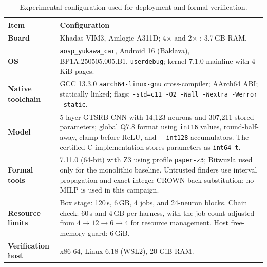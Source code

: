 \begin{table}[h]
\centering
\caption{Experimental configuration used for deployment and formal verification.}
\label{tab:setup}
\scriptsize
\renewcommand{\arraystretch}{1.12}
\setlength{\tabcolsep}{4pt}
\begin{tabularx}{\columnwidth}{@{}>{\bfseries}p{}X@{}}
\toprule
\textbf{Item} & \textbf{Configuration} \\
\midrule

Board &
Khadas VIM3, Amlogic A311D; 4$\times$ \Aseven{} and
2$\times$ \Athree{}; 3.7\,GB RAM. \\

\addlinespace[1pt]
OS &
\AAOS{} \texttt{aosp\_yukawa\_car}, Android 16 (Baklava),
BP1A.250505.005.B1, \texttt{userdebug}; kernel
7.1.0-mainline with 4\,KiB pages. \\

\addlinespace[1pt]
Native toolchain &
GCC 13.3.0 \texttt{aarch64-linux-gnu} cross-compiler;
AArch64 ABI; statically linked; flags:
\texttt{-std=c11 -O2 -Wall -Wextra -Werror -static}. \\

\addlinespace[1pt]
Model &
5-layer GTSRB CNN with 14,123 neurons and 307,211 stored
parameters; global Q7.8 format using \texttt{int16} values,
round-half-away, clamp before ReLU, and
\texttt{\_\_int128} accumulators. The certified C
implementation stores parameters as \texttt{int64\_t}. \\

\addlinespace[1pt]
Formal tools &
\ESBMC{} 7.11.0 (64-bit) with Z3 using profile
\texttt{paper-z3}; Bitwuzla used only for the monolithic
baseline. Untrusted finders use interval propagation and
exact-integer CROWN back-substitution; no MILP is used in
this campaign. \\

\addlinespace[1pt]
Resource limits &
Box stage: 120\,s, 6\,GB, 4 jobs, and 24-neuron blocks.
Chain check: 60\,s and 4\,GB per harness, with the job count
adjusted from $4\!\rightarrow\!12\!\rightarrow\!6\!\rightarrow\!4$
for resource management. Host free-memory guard: 6\,GiB. \\

\addlinespace[1pt]
Verification host &
x86-64, Linux 6.18 (WSL2), 20 GiB RAM. \\

\bottomrule
\end{tabularx}
\end{table}



